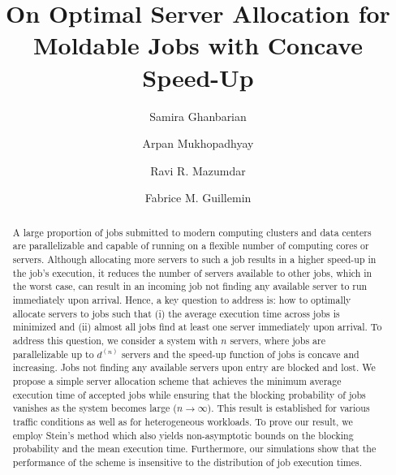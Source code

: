 \documentclass[a4paper]{article}
\title{On Optimal Server Allocation for Moldable Jobs with Concave Speed-Up}
\author[1]{Samira Ghanbarian}
\author[2]{Arpan Mukhopadhyay}
\author[3]{Ravi R. Mazumdar}
\author[4]{Fabrice M. Guillemin}
\affil[1,3]{University of Waterloo, Waterloo, Canada}
\affil[2]{University of Warwick, Coventry, U.K.}
\affil[3]{Orange Innovation, Lannion, France}
\date{} %
\theoremstyle{plain}
\theoremstyle{definition}
\theoremstyle{case}
\theoremstyle{remark}
\begin{document}
\maketitle

\begin{abstract}
A large proportion of jobs submitted to modern computing clusters and data centers are parallelizable and capable of running on a flexible number of computing cores or servers. 
Although allocating more servers to such a job results in a higher speed-up in the job's execution, it reduces the number of servers available to other jobs, which in the worst case, can result in an incoming job not finding any available server to run immediately upon arrival.
Hence, a key question to address is: how to optimally allocate servers to jobs such that (i) the average execution time across jobs is minimized and (ii) almost all jobs find at least one server immediately upon arrival. 
To address this question, we consider a system with $n$ servers, where jobs are parallelizable up to $d^{(n)}$ servers and the speed-up function of jobs is concave and increasing. Jobs not finding any available servers upon entry are blocked and lost.
We propose a simple server allocation scheme that achieves the minimum average execution time of accepted jobs while ensuring that the blocking probability of jobs vanishes as the system becomes large ($n \to \infty$). This result is established for various traffic conditions as well as for heterogeneous workloads.
To prove our result, we employ Stein's method which also yields non-asymptotic bounds on the blocking probability and the mean execution time. Furthermore, our simulations show that the performance of the scheme is insensitive to the distribution of job execution times.
\end{abstract}
\end{document}
